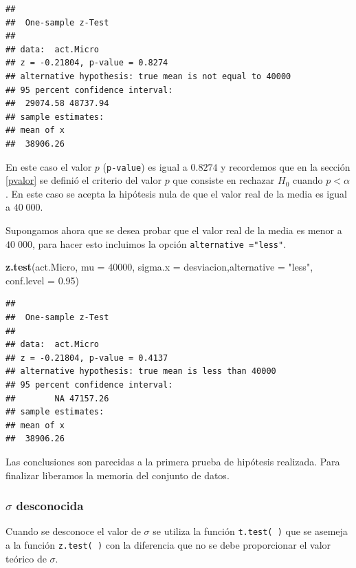 \documentclass[letterpaper,]{book}
\newenvironment{Shaded}{\begin{snugshade}}{\end{snugshade}}
\newcommand{\DataTypeTok}[1]{\textcolor[rgb]{0.13,0.29,0.53}{#1}}
\newcommand{\DecValTok}[1]{\textcolor[rgb]{0.00,0.00,0.81}{#1}}
\newcommand{\FloatTok}[1]{\textcolor[rgb]{0.00,0.00,0.81}{#1}}
\newcommand{\KeywordTok}[1]{\textcolor[rgb]{0.13,0.29,0.53}{\textbf{#1}}}
\newcommand{\NormalTok}[1]{#1}
\newcommand{\StringTok}[1]{\textcolor[rgb]{0.31,0.60,0.02}{#1}}
\begin{document}
\begin{verbatim}
## 
##  One-sample z-Test
## 
## data:  act.Micro
## z = -0.21804, p-value = 0.8274
## alternative hypothesis: true mean is not equal to 40000
## 95 percent confidence interval:
##  29074.58 48737.94
## sample estimates:
## mean of x 
##  38906.26
\end{verbatim}

En este caso el valor \(p\) (\texttt{p-value}) es igual a \(0.8274\) y recordemos que en la sección \ref{pvalor} se definió el criterio del valor \(p\) que consiste en rechazar \(H_0\) cuando \(p < \alpha\). En este caso se acepta la hipótesis nula de que el valor real de la media es igual a \(40\;000\).

Supongamos ahora que se desea probar que el valor real de la media es menor a \(40\;000\), para hacer esto incluimos la opción \texttt{alternative\ ="less"}.

\begin{Shaded}
\begin{Highlighting}[]
\KeywordTok{z.test}\NormalTok{(act.Micro, }\DataTypeTok{mu =} \DecValTok{40000}\NormalTok{, }\DataTypeTok{sigma.x =}\NormalTok{ desviacion,}\DataTypeTok{alternative =} \StringTok{"less"}\NormalTok{,  }\DataTypeTok{conf.level =} \FloatTok{0.95}\NormalTok{)}
\end{Highlighting}
\end{Shaded}

\begin{verbatim}
## 
##  One-sample z-Test
## 
## data:  act.Micro
## z = -0.21804, p-value = 0.4137
## alternative hypothesis: true mean is less than 40000
## 95 percent confidence interval:
##        NA 47157.26
## sample estimates:
## mean of x 
##  38906.26
\end{verbatim}

Las conclusiones son parecidas a la primera prueba de hipótesis realizada. Para finalizar liberamos la memoria del conjunto de datos.

\hypertarget{sigma-desconocida}{%
\subsubsection{\texorpdfstring{\(\sigma\) desconocida}{\textbackslash{}sigma desconocida}}\label{sigma-desconocida}}

Cuando se desconoce el valor de \(\sigma\) se utiliza la función \texttt{t.test(\ )} que se asemeja a la función \texttt{z.test(\ )} con la diferencia que no se debe proporcionar el valor teórico de \(\sigma\).
\end{document}
